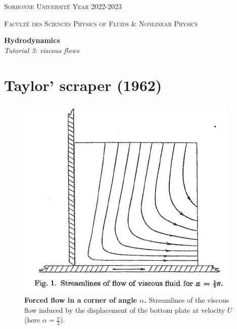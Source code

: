\documentclass[11pt,a4paper]{article}
\begin{document}
\setlength{\unitlength}{1cm}
\noindent
\parbox{\textwidth}{
\textsc{
Sorbonne Université  
\hfill
Year 2022-2023
}
}
\parbox{\textwidth}{
\textsc{
Faculté des Sciences
\hfill
Physics of Fluids \& Nonlinear Physics
}
}

\begin{center}
\Large
\textbf{Hydrodynamics} \\ 
\textsl{Tutorial 3: viscous flows} \\[1ex]
\end{center}

\section{Taylor' scraper (1962)}
\begin{figure}[ht]
    \centering
    \includegraphics{p411_taylor.png}
    \caption{\textbf{Forced flow in a corner of angle $\alpha$.} Streamlines of the viscous flow induced by the displacement of the bottom plate at velocity $U$ (here $\alpha = \frac{\pi}{2}$).}
    \label{fig:scraper}
\end{figure}
\end{document}
